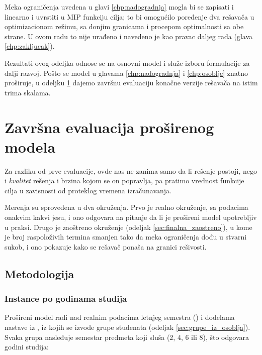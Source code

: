 \documentclass[12pt,oneside]{memoir}
\begin{document}
Meka ograničenja uvedena u glavi \ref{chp:nadogradnja} mogla bi se
zapisati i linearno i uvrstiti u MIP funkciju cilja; to bi omogućilo
poređenje dva rešavača u optimizacionom režimu, sa donjim granicama i
procepom optimalnosti sa obe strane. U ovom radu to nije urađeno i
navedeno je kao pravac daljeg rada (glava \ref{chp:zakljucak}).

Rezultati ovog odeljka odnose se na osnovni model i služe izboru
formulacije za dalji razvoj. Pošto se model u glavama
\ref{chp:nadogradnja} i \ref{chp:osoblje} znatno proširuje, u odeljku
\ref{sec:zavrsna-evaluacija} dajemo završnu evaluaciju konačne verzije
rešavača na istim trima skalama.


\section{Završna evaluacija proširenog modela}
\label{sec:zavrsna-evaluacija}

Za razliku od prve evaluacije, ovde nas ne zanima samo
da li rešenje postoji, nego i \emph{kvalitet} rešenja i brzina kojom se
on popravlja, pa pratimo vrednost funkcije cilja u zavisnosti od
proteklog vremena izračunavanja.

Merenja su sprovedena u dva okruženja. Prvo je realno okruženje, sa
podacima onakvim kakvi jesu, i ono odgovara na pitanje da li je
prošireni model upotrebljiv u praksi. Drugo je zaoštreno okruženje
(odeljak \ref{sec:finalna_zaostreno}), u kome je broj raspoloživih
termina smanjen tako da meka ograničenja dođu u stvarni sukob, i ono
pokazuje kako se rešavač ponaša na granici rešivosti.

\subsection{Metodologija}
\label{sec:finalna_metodologija}

\subsubsection{Instance po godinama studija}

Prošireni model radi nad realnim podacima letnjeg semestra
() i dodelama nastave iz
, iz kojih se izvode grupe studenata
(odeljak \ref{sec:grupe_iz_osoblja}). Svaka grupa nasleđuje semestar
predmeta koji sluša (2, 4, 6 ili 8), što odgovara godini studija:
\end{document}
